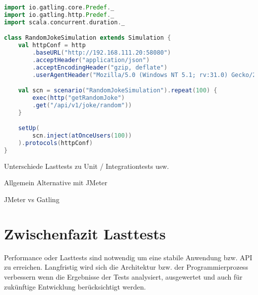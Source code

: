 \begin{minipage}{\linewidth}
\begin{lstlisting}[frame=single,caption=Testabfrage auf Schnittstelle, label=testCodingSample, language=Scala]
import io.gatling.core.Predef._
import io.gatling.http.Predef._
import scala.concurrent.duration._

class RandomJokeSimulation extends Simulation {
    val httpConf = http
        .baseURL("http://192.168.111.20:58080")
        .acceptHeader("application/json")
        .acceptEncodingHeader("gzip, deflate")
        .userAgentHeader("Mozilla/5.0 (Windows NT 5.1; rv:31.0) Gecko/20100101 Firefox/31.0")

    val scn = scenario("RandomJokeSimulation").repeat(100) {
        exec(http("getRandomJoke")
        .get("/api/v1/joke/random"))
    }    

    setUp(
        scn.inject(atOnceUsers(100))
    ).protocols(httpConf)
}
\end{lstlisting}
\end{minipage}



Unterschiede Lasttests zu Unit / Integrationtests usw.



Allgemein Alternative mit JMeter

JMeter vs Gatling


\section{Zwischenfazit Lasttests}

Performance oder Lasttests sind notwendig um eine stabile Anwendung bzw. API zu erreichen.
Langfristig wird sich die Architektur bzw. der Programmierprozess verbessern wenn die Ergebnisse der Tests analysiert, ausgewertet und auch für zukünftige Entwicklung berücksichtigt werden.


